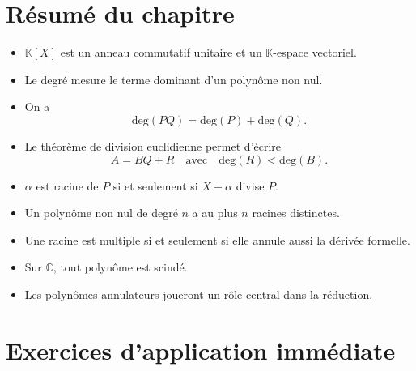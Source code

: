 \documentclass[11pt,a4paper]{article}
\theoremstyle{remark}
\newcommand{\C}{\mathbb{C}}
\newcommand{\K}{\mathbb{K}}
\newcommand{\degP}{\mathrm{deg}}
\begin{document}
\section{Résumé du chapitre}

\begin{itemize}
    \item \(\K[X]\) est un anneau commutatif unitaire et un \(\K\)-espace vectoriel.
    \item Le degré mesure le terme dominant d’un polynôme non nul.
    \item On a
    \[
    \degP(PQ)=\degP(P)+\degP(Q).
    \]
    \item Le théorème de division euclidienne permet d’écrire
    \[
    A=BQ+R
    \quad \text{avec} \quad
    \degP(R)<\degP(B).
    \]
    \item \(\alpha\) est racine de \(P\) si et seulement si \(X-\alpha\) divise \(P\).
    \item Un polynôme non nul de degré \(n\) a au plus \(n\) racines distinctes.
    \item Une racine est multiple si et seulement si elle annule aussi la dérivée formelle.
    \item Sur \(\C\), tout polynôme est scindé.
    \item Les polynômes annulateurs joueront un rôle central dans la réduction.
\end{itemize}

\section*{Exercices d’application immédiate}
\end{document}
